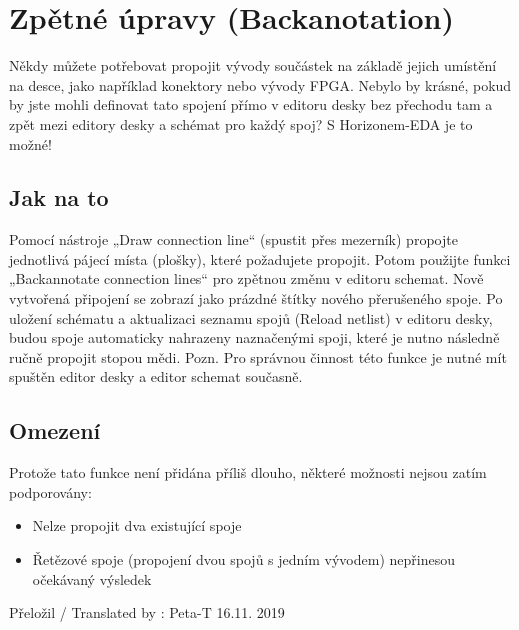 \documentclass[letterpaper,10pt,czech]{sphinxmanual}
\begin{document}
\chapter{Zpětné úpravy (Backanotation)}
\label{\detokenize{backannotation:zpetne-upravy-backanotation}}\label{\detokenize{backannotation::doc}}
Někdy můžete potřebovat propojit vývody součástek na základě jejich
umístění na desce, jako například konektory nebo vývody FPGA. Nebylo by krásné, pokud by jste mohli definovat tato spojení přímo v editoru desky bez přechodu tam a zpět mezi editory desky a  schémat pro každý spoj? S Horizonem-EDA je to možné!


\section{Jak na to}
\label{\detokenize{backannotation:jak-na-to}}
Pomocí nástroje „Draw connection line“ (spustit přes mezerník) propojte jednotlivá pájecí místa (plošky), které požadujete propojit. Potom použijte funkci „Backannotate connection lines“ pro zpětnou změnu v editoru schemat. Nově vytvořená připojení se zobrazí jako prázdné štítky nového přerušeného spoje. Po uložení schématu a aktualizaci seznamu spojů (Reload netlist) v editoru desky, budou spoje automaticky nahrazeny naznačenými spoji, které je nutno následně ručně propojit stopou mědi. Pozn. Pro správnou činnost této funkce je nutné mít spuštěn editor desky a editor schemat současně.


\section{Omezení}
\label{\detokenize{backannotation:omezeni}}
Protože tato funkce není přidána příliš dlouho, některé možnosti nejsou zatím podporovány:
\begin{itemize}
\item {} 
Nelze propojit dva existující spoje

\item {} 
Řetězové spoje (propojení dvou spojů s jedním vývodem) nepřinesou očekávaný výsledek

\end{itemize}

%
\begin{footnote}[1]\sphinxAtStartFootnote
Přeložil / Translated by : Peta-T 16.11. 2019
%
\end{footnote}



\renewcommand{\indexname}{Rejstřík}
\printindex
\end{document}
